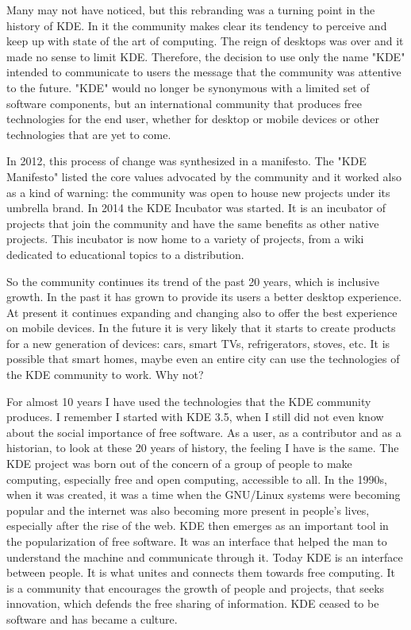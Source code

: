 Many may not have noticed, but this rebranding was a turning point in the history of KDE. In it the community makes clear its tendency to perceive and keep up with state of the art of computing. The reign of desktops was over and it made no sense to limit KDE. Therefore, the decision to use only the name "KDE" intended to communicate to users the message that the community was attentive to the future. "KDE" would no longer be synonymous with a limited set of software components, but an international community that produces free technologies for the end user, whether for desktop or mobile devices or other technologies that are yet to come. 

In 2012, this process of change was synthesized in a manifesto. The "KDE Manifesto" listed the core values advocated by the community and it worked also as a kind of warning: the community was open to house new projects under its umbrella brand. In 2014 the KDE Incubator was started. It is an incubator of projects that join the community and have the same benefits as other native projects. This incubator is now home to a variety of projects, from a wiki dedicated to educational topics to a distribution. 

So the community continues its trend of the past 20 years, which is inclusive growth. In the past it has grown to provide its users a better desktop experience. At present it continues expanding and changing also to offer the best experience on mobile devices. In the future it is very likely that it starts to create products for a new generation of devices: cars, smart TVs, refrigerators, stoves, etc. It is possible that smart homes, maybe even an entire city can use the technologies of the KDE community to work. Why not? 

For almost 10 years I have used the technologies that the KDE community produces. I remember I started with KDE 3.5, when I still did not even know about the social importance of free software. As a user, as a contributor and as a historian, to look at these 20 years of history, the feeling I have is the same. The KDE project was born out of the concern of a group of people to make computing, especially free and open computing, accessible to all. In the 1990s, when it was created, it was a time when the GNU/Linux systems were becoming popular and the internet was also becoming more present in people's lives, especially after the rise of the web. KDE then emerges as an important tool in the popularization of free software. It was an interface that helped the man to understand the machine and communicate through it. Today KDE is an interface between people. It is what unites and connects them towards free computing. It is a community that encourages the growth of people and projects, that seeks innovation, which defends the free sharing of information. KDE ceased to be software and has became a culture.
